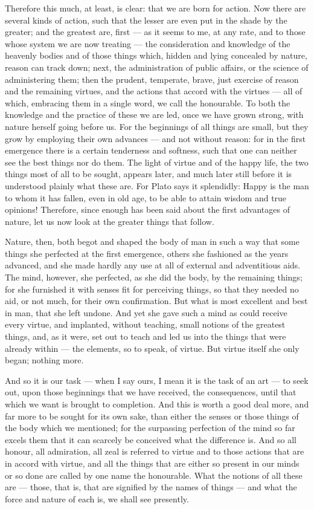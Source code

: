  Therefore this much, at least, is clear: that we are born for action. Now there are several kinds of action, such that the lesser are even put in the shade by the greater; and the greatest are, first — as it seems to me, at any rate, and to those whose system we are now treating — the consideration and knowledge of the heavenly bodies and of those things which, hidden and lying concealed by nature, reason can track down; next, the administration of public affairs, or the science of administering them; then the prudent, temperate, brave, just exercise of reason and the remaining virtues, and the actions that accord with the virtues — all of which, embracing them in a single word, we call the honourable. To both the knowledge and the practice of these we are led, once we have grown strong, with nature herself going before us. For the beginnings of all things are small, but they grow by employing their own advances — and not without reason: for in the first emergence there is a certain tenderness and softness, such that one can neither see the best things nor do them. The light of virtue and of the happy life, the two things most of all to be sought, appears later, and much later still before it is understood plainly what these are. For Plato says it splendidly: Happy is the man to whom it has fallen, even in old age, to be able to attain wisdom and true opinions! Therefore, since enough has been said about the first advantages of nature, let us now look at the greater things that follow.

 Nature, then, both begot and shaped the body of man in such a way that some things she perfected at the first emergence, others she fashioned as the years advanced, and she made hardly any use at all of external and adventitious aids. The mind, however, she perfected, as she did the body, by the remaining things; for she furnished it with senses fit for perceiving things, so that they needed no aid, or not much, for their own confirmation. But what is most excellent and best in man, that she left undone. And yet she gave such a mind as could receive every virtue, and implanted, without teaching, small notions of the greatest things, and, as it were, set out to teach and led us into the things that were already within — the elements, so to speak, of virtue. But virtue itself she only began; nothing more.

 And so it is our task — when I say ours, I mean it is the task of an art — to seek out, upon those beginnings that we have received, the consequences, until that which we want is brought to completion. And this is worth a good deal more, and far more to be sought for its own sake, than either the senses or those things of the body which we mentioned; for the surpassing perfection of the mind so far excels them that it can scarcely be conceived what the difference is. And so all honour, all admiration, all zeal is referred to virtue and to those actions that are in accord with virtue, and all the things that are either so present in our minds or so done are called by one name the honourable. What the notions of all these are — those, that is, that are signified by the names of things — and what the force and nature of each is, we shall see presently.

